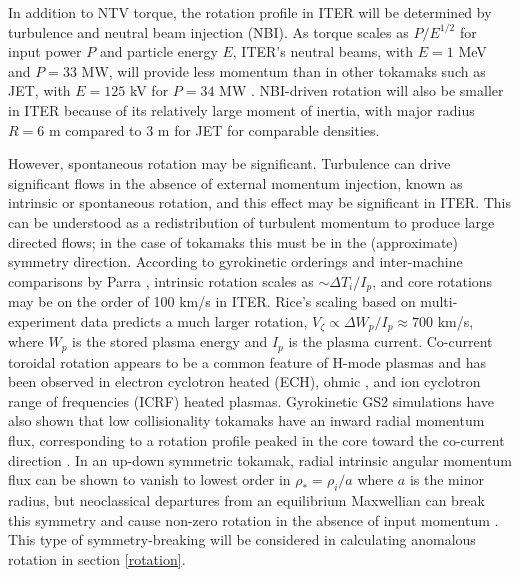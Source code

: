 \documentclass{article}
\numberwithin{figure}{section}
\numberwithin{equation}{section}
\begin{document}
In addition to NTV torque, the rotation profile in ITER will be determined by turbulence and neutral beam injection (NBI). 
As torque scales as $P/E^{1/2}$ for input power $P$ and particle energy $E$, ITER's neutral beams, with $E = 1$ MeV and $P = 33$ MW, will provide less momentum than in other tokamaks such as JET, with $E = 125$ kV for $P = 34$ MW \cite{Ciric2011}. NBI-driven rotation will also be smaller in ITER because of its relatively large moment of inertia, with major radius $R = 6$ m compared to 3 m for JET for comparable densities. 

However, spontaneous rotation may be significant. Turbulence can drive significant flows in the absence of external momentum injection, known as intrinsic or spontaneous rotation, and this effect may be significant in ITER. This can be understood as a redistribution of turbulent momentum to produce large directed flows; in the case of tokamaks this must be in the (approximate) symmetry direction. According to gyrokinetic orderings and inter-machine comparisons by Parra \cite{Parra2012}, intrinsic rotation scales as $\sim \Delta T_i/I_p$, and core rotations may be on the order of 100 km/s in ITER. Rice's scaling based on multi-experiment data \cite{Rice2007} predicts a much larger rotation, $V_{\zeta} \propto \Delta W_p/I_p \approx 700$ km/s, where $W_p$ is the stored plasma energy and $I_p$ is the plasma current. Co-current toroidal rotation appears to be a common feature of H-mode plasmas and has been observed in electron cyclotron heated (ECH)\cite{DeGrassie2007}, ohmic \cite{DeGrassie2007}, and ion cyclotron range of frequencies (ICRF) \cite{Noterdaeme2003} heated plasmas. Gyrokinetic GS2 simulations have also shown that low collisionality tokamaks have an inward radial momentum flux, corresponding to a rotation profile peaked in the core toward the co-current direction \cite{Barnes2013}. In an up-down symmetric tokamak, radial intrinsic angular momentum flux can be shown to vanish to lowest order in $\rho_* = \rho_i/a$ where $a$ is the minor radius, but neoclassical departures from an equilibrium Maxwellian can break this symmetry and cause non-zero rotation in the absence of input momentum \cite{Barnes2013}. This type of symmetry-breaking will be considered in calculating anomalous rotation in section \ref{rotation}. 
\end{document}

